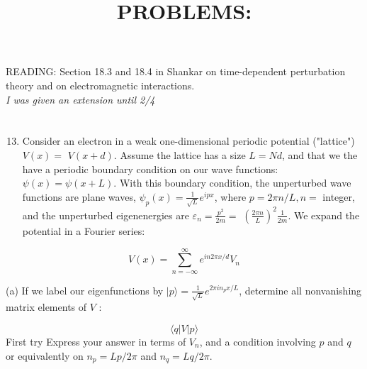 \documentclass[12pt]{article}
\title{PROBLEMS: }
\author{}
\date{}
\begin{document}
\maketitle
READING: Section 18.3 and 18.4 in Shankar on time-dependent perturbation theory and on electromagnetic interactions.\\
\emph{I was given an extension until 2/4}
\section{}
\begin{enumerate}
  \setcounter{enumi}{12}
  \item Consider an electron in a weak one-dimensional periodic potential ("lattice") $V(x)=$ $V(x+d)$. Assume the lattice has a size $L=N d$, and that we the have a periodic boundary condition on our wave functions: $\psi(x)=\psi(x+L)$. With this boundary condition, the unperturbed wave functions are plane waves, $\psi_{p}(x)=\frac{1}{\sqrt{L}} e^{i p x}$, where $p=2 \pi n / L, n=$ integer, and the unperturbed eigenenergies are $\varepsilon_{n}=\frac{p^{2}}{2 m}=$ $\left(\frac{2 \pi n}{L}\right)^{2} \frac{1}{2 m}$. We expand the potential in a Fourier series:
\end{enumerate}

$$
V(x)=\sum_{n=-\infty}^{\infty} e^{i n 2 \pi x / d} V_{n}
$$

(a) If we label our eigenfunctions by $|p\rangle=\frac{1}{\sqrt{L}} e^{2 \pi i n_{p} x / L}$, determine all nonvanishing matrix elements of $V$ :

$$
\langle q|V| p\rangle
$$First try
Express your answer in terms of $V_{n}$, and a condition involving $p$ and $q$ or equivalently on $n_{p}=L p / 2 \pi$ and $n_{q}=L q / 2 \pi$.
\end{document}
